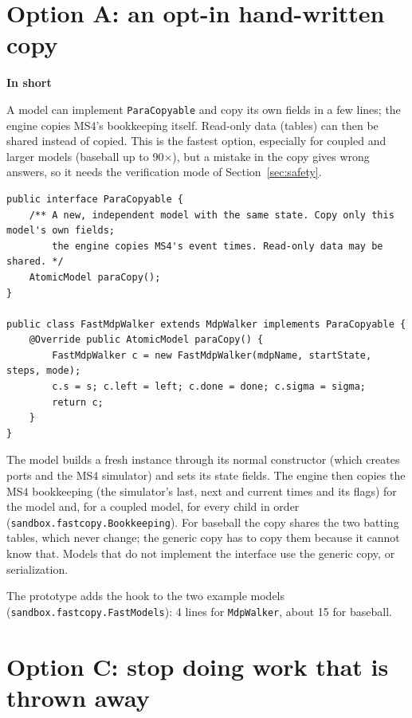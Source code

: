\documentclass[11pt]{article}
\newcommand{\code}[1]{\texttt{#1}}
\newcommand{\shadedbox}[3]{\par\smallskip\noindent\colorbox{#1}{\parbox{\dimexpr\linewidth-2\fboxsep}{\textbf{#2}\par #3}}\par\smallskip}
\newcommand{\takeaway}[1]{\shadedbox{okbg}{In short}{#1}}
\begin{document}
\section{Option A: an opt-in hand-written copy}\label{sec:hook}

\takeaway{A model can implement \code{ParaCopyable} and copy its own fields in a few lines; the engine copies MS4's
bookkeeping itself. Read-only data (tables) can then be shared instead of copied. This is the fastest option,
especially for coupled and larger models (baseball up to 90$\times$), but a mistake in the copy gives wrong answers,
so it needs the verification mode of Section~\ref{sec:safety}.}

\begin{lstlisting}
public interface ParaCopyable {
    /** A new, independent model with the same state. Copy only this model's own fields;
        the engine copies MS4's event times. Read-only data may be shared. */
    AtomicModel paraCopy();
}

public class FastMdpWalker extends MdpWalker implements ParaCopyable {
    @Override public AtomicModel paraCopy() {
        FastMdpWalker c = new FastMdpWalker(mdpName, startState, steps, mode);
        c.s = s; c.left = left; c.done = done; c.sigma = sigma;
        return c;
    }
}
\end{lstlisting}

The model builds a fresh instance through its normal constructor (which creates ports and the MS4 simulator) and sets
its state fields. The engine then copies the MS4 bookkeeping (the simulator's last, next and current times and its
flags) for the model and, for a coupled model, for every child in order (\code{sandbox.fastcopy.Bookkeeping}). For
baseball the copy shares the two batting tables, which never change; the generic copy has to copy them because it
cannot know that. Models that do not implement the interface use the generic copy, or serialization.

The prototype adds the hook to the two example models (\code{sandbox.fastcopy.FastModels}): 4 lines for
\code{MdpWalker}, about 15 for baseball.

\section{Option C: stop doing work that is thrown away}\label{sec:waste}
\end{document}
